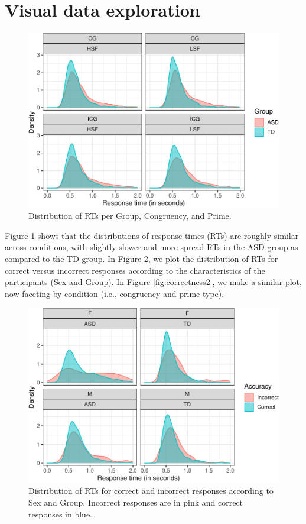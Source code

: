\documentclass[
  11pt,
  english,
  ,doc,floatsintext]{apa6}
\begin{document}
\newpage

\hypertarget{visual-data-exploration}{%
\section{Visual data exploration}\label{visual-data-exploration}}

\begin{figure}[!htb]

{\centering \includegraphics[width=0.75\linewidth]{supplementary_materials_files/figure-latex/data-1} 

}

\caption{Distribution of RTs per Group, Congruency, and Prime.}\label{fig:data}
\end{figure}

Figure \ref{fig:data} shows that the distributions of response times (RTs) are roughly similar across conditions, with slightly slower and more spread RTs in the ASD group as compared to the TD group. In Figure \ref{fig:correctness1}, we plot the distribution of RTs for correct versus incorrect responses according to the characteristics of the participants (Sex and Group). In Figure \ref{fig:correctness2}, we make a similar plot, now faceting by condition (i.e., congruency and prime type).

\begin{figure}[!htb]

{\centering \includegraphics[width=0.75\linewidth]{supplementary_materials_files/figure-latex/correctness1-1} 

}

\caption{Distribution of RTs for correct and incorrect responses according to Sex and Group. Incorrect responses are in pink and correct responses in blue.}\label{fig:correctness1}
\end{figure}
\end{document}
